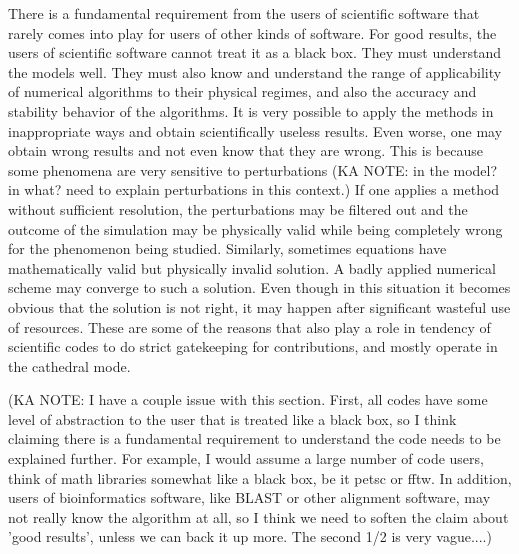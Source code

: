 \label{sec:using}
There is a fundamental requirement from the users of scientific
software that rarely comes into play for users of other kinds of
software. For good results, the users of scientific software cannot
treat it as a black box. They must understand the models well. They
must also know and understand the range of applicability of numerical
algorithms to their physical regimes, and also the accuracy and
stability behavior of the algorithms. It is very possible to apply the
methods in inappropriate ways and obtain scientifically useless
results. Even worse, one may obtain wrong results and not even know
that they are wrong. 
This is because some phenomena are very sensitive
to perturbations (KA NOTE: in the model?  in what?  need to explain perturbations in this context.) If one applies a method without sufficient
resolution, the perturbations may be filtered out and the outcome of
the simulation may be physically valid while being completely wrong
for the phenomenon being studied. Similarly, sometimes equations have
mathematically valid but physically invalid solution. A badly applied
numerical scheme may converge to such a solution. Even though in this
situation it becomes obvious that the solution is not right, it may
happen after significant wasteful use of resources.
These are some of the reasons that also play a role in tendency of scientific
codes to do strict gatekeeping for contributions,  and mostly operate
in the cathedral mode.  

(KA NOTE:  I have a couple issue with this section.  First, all codes have some level of abstraction to the user that is treated like a black box, so I think claiming there is a fundamental requirement to understand the code needs to be explained further.  For example, I would assume a large number of code users, think of math libraries somewhat like a black box, be it petsc or fftw.  In addition, users of bioinformatics software, like BLAST or other alignment software, may not really know the algorithm at all, so I think we need to soften the claim about 'good results', unless we can back it up more.  The second 1/2 is very vague....)